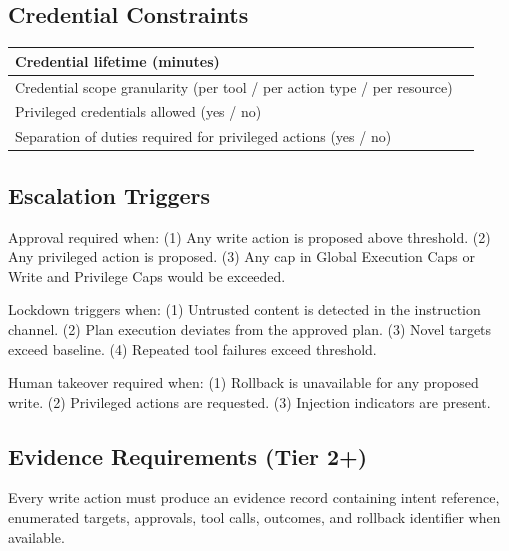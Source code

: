 \documentclass[11pt]{article}
\begin{document}
\subsection{Credential Constraints}
\begin{longtable}{>{\raggedright\arraybackslash}p{2.6in}p{3.4in}}
Credential lifetime (minutes) & \\ \hline
Credential scope granularity (per tool / per action type / per resource) & \\ \hline
Privileged credentials allowed (yes / no) & \\ \hline
Separation of duties required for privileged actions (yes / no) & \\ \hline
\end{longtable}

\subsection{Escalation Triggers}
Approval required when: (1) Any write action is proposed above threshold. (2) Any privileged action is proposed. (3) Any cap in Global Execution Caps or Write and Privilege Caps would be exceeded.

Lockdown triggers when: (1) Untrusted content is detected in the instruction channel. (2) Plan execution deviates from the approved plan. (3) Novel targets exceed baseline. (4) Repeated tool failures exceed threshold.

Human takeover required when: (1) Rollback is unavailable for any proposed write. (2) Privileged actions are requested. (3) Injection indicators are present.

\subsection{Evidence Requirements (Tier 2+)}
Every write action must produce an evidence record containing intent reference, enumerated targets, approvals, tool calls, outcomes, and rollback identifier when available.
\end{document}
